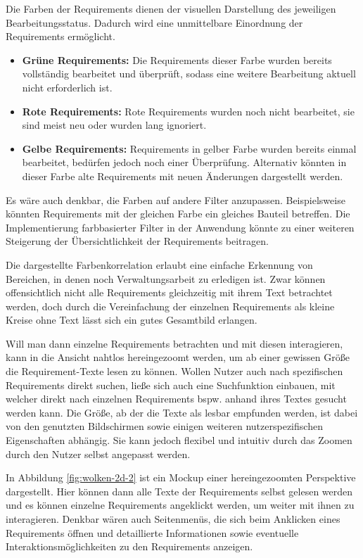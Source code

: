 \newpage

Die Farben der Requirements dienen der visuellen Darstellung des jeweiligen Bearbeitungsstatus.
Dadurch wird eine unmittelbare Einordnung der Requirements ermöglicht.
\begin{itemize}
    \item \textbf{Grüne Requirements:} Die Requirements dieser Farbe wurden bereits vollständig bearbeitet und überprüft, sodass eine weitere Bearbeitung aktuell nicht erforderlich ist.
    \item \textbf{Rote Requirements:} Rote Requirements wurden noch nicht bearbeitet, sie sind meist neu oder wurden lang ignoriert.
    \item \textbf{Gelbe Requirements:} Requirements in gelber Farbe wurden bereits einmal bearbeitet, bedürfen jedoch noch einer Überprüfung. Alternativ könnten in dieser Farbe alte Requirements mit neuen Änderungen dargestellt werden.
\end{itemize}
Es wäre auch denkbar, die Farben auf andere Filter anzupassen.
Beispielsweise könnten Requirements mit der gleichen Farbe ein gleiches Bauteil betreffen.
Die Implementierung farbbasierter Filter in der Anwendung könnte zu einer weiteren Steigerung der Übersichtlichkeit der Requirements beitragen.

Die dargestellte Farbenkorrelation erlaubt eine einfache Erkennung von Bereichen, in denen noch Verwaltungsarbeit zu erledigen ist.
Zwar können offensichtlich nicht alle Requirements gleichzeitig mit ihrem Text betrachtet werden, doch durch die Vereinfachung der einzelnen Requirements als kleine Kreise ohne Text lässt sich ein gutes Gesamtbild erlangen.


Will man dann einzelne Requirements betrachten und mit diesen interagieren, kann in die Ansicht nahtlos hereingezoomt werden, um ab einer gewissen Größe die Requirement-Texte lesen zu können.
Wollen Nutzer auch nach spezifischen Requirements direkt suchen, ließe sich auch eine Suchfunktion einbauen, mit welcher direkt nach einzelnen Requirements bspw. anhand ihres Textes gesucht werden kann.
Die Größe, ab der die Texte als lesbar empfunden werden, ist dabei von den genutzten Bildschirmen sowie einigen weiteren nutzerspezifischen Eigenschaften abhängig.
Sie kann jedoch flexibel und intuitiv durch das Zoomen durch den Nutzer selbst angepasst werden.

\newpage

In Abbildung \ref{fig:wolken-2d-2} ist ein Mockup einer hereingezoomten Perspektive dargestellt.
Hier können dann alle Texte der Requirements selbst gelesen werden und es können einzelne Requirements angeklickt werden, um weiter mit ihnen zu interagieren.
Denkbar wären auch Seitenmenüs, die sich beim Anklicken eines Requirements öffnen und detaillierte Informationen sowie eventuelle Interaktionsmöglichkeiten zu den Requirements anzeigen. 

